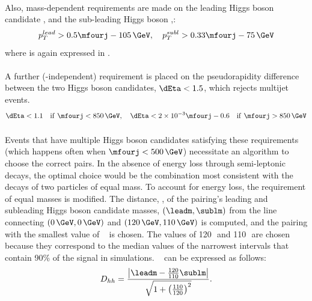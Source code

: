 \paragraph{}
Also, mass-dependent requirements are made on the leading Higgs boson candidate \pt, and the sub-leading Higgs boson \pt,:
\begin{equation}
p_T^{lead} > 0.5\mfourj - 105\,\GeV, \quad
p_T^{subl} > 0.33\mfourj - 75\,\GeV
\end{equation}
where \mfourj is again expressed in \GeV.

\paragraph{}
A further (\mfourj-independent) requirement is placed on the pseudorapidity difference between the two Higgs boson candidates, $\dEta < 1.5$, which rejects multijet events.
\begin{equation}
\dEta < 1.1 \quad \mathrm{if}\ \mfourj < 850\,\GeV , \quad
\dEta < 2\times10^{-3} \mfourj - 0.6 \quad \mathrm{if}\ \mfourj > 850\,\GeV
\end{equation}

\paragraph{}
Events that have multiple Higgs boson candidates satisfying these requirements (which happens often when $\mfourj < 500\,\GeV$) necessitate an algorithm to choose the correct pairs. 
In the absence of energy loss through semi-leptonic decays, the optimal choice would be the combination most consistent with the decays of two particles of equal mass.
To account for energy loss, the requirement of equal masses is modified. 
The distance, \Dhh, of the pairing's leading and subleading Higgs boson candidate masses, $\left(\leadm, \sublm\right)$ from the line connecting $\left(0\,\GeV, 0\,\GeV\right)$ and $\left(120\,\GeV, 110\,\GeV\right)$ is computed, and the pairing with the smallest value of \Dhh~ is chosen.
The values of 120\,\GeV\, and 110\,\GeV\, are chosen because they correspond to the median values of the narrowest intervals that contain 90\% of the signal in simulations.%
\Dhh~ can be expressed as follows:
\begin{equation}
D_{hh} = \frac{\left|\leadm - \frac{120}{110}\sublm\right|}{\sqrt{1+\left(\frac{110}{120}\right)^{2}}}.
\end{equation}

